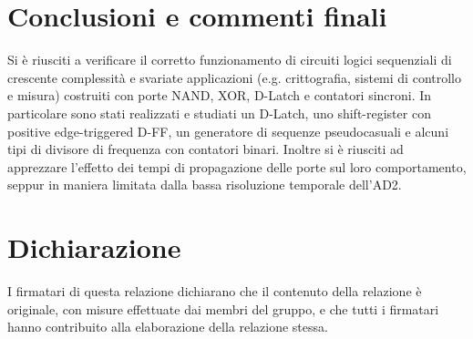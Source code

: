 \documentclass[10pt, a4paper, italian]{article}
\begin{document}
\section*{Conclusioni e commenti finali}
Si è riusciti a verificare il corretto funzionamento di circuiti logici
sequenziali di crescente complessità e svariate applicazioni (e.g.
crittografia, sistemi di controllo e misura) costruiti con porte NAND, XOR,
D-Latch e contatori sincroni.
In particolare sono stati realizzati e studiati un D-Latch, uno shift-register
con positive edge-triggered D-FF, un generatore di sequenze pseudocasuali e
alcuni tipi di divisore di frequenza con contatori binari.
Inoltre si è riusciti ad apprezzare l'effetto dei tempi di propagazione
delle porte sul loro comportamento, seppur in maniera limitata dalla bassa
risoluzione temporale dell'AD2.

\section*{Dichiarazione}
I firmatari di questa relazione dichiarano che il contenuto della relazione \`e
originale, con misure effettuate dai membri del gruppo, e che tutti i firmatari
hanno contribuito alla elaborazione della relazione stessa.
\end{document}
